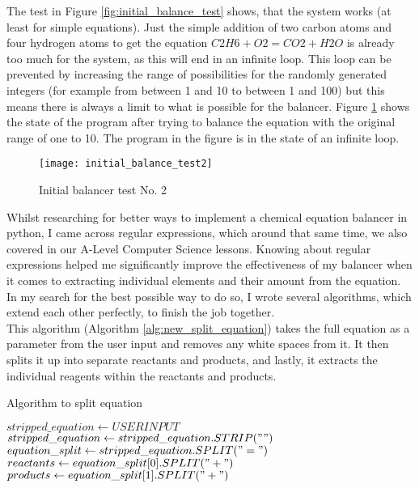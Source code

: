 \documentclass[a4paper,12pt]{article}
\begin{document}
The test in Figure \ref{fig:initial_balance_test} shows, that the system works (at least for simple equations). Just the simple addition of two carbon atoms and four hydrogen atoms to get the equation $ C2H6 + O2 = CO2 + H2O$ is already too much for the system, as this will end in an infinite loop. This loop can be prevented by increasing the range of possibilities for the randomly generated integers (for example from between 1 and 10 to between 1 and 100) but this means there is always a limit to what is possible for the balancer. Figure \ref{fig:second_balance_test} shows the state of the program after trying to balance the equation with the original range of one to 10. The program in the figure is in the state of an infinite loop.

\begin{figure} [h]
	\centering
	\texttt{[image: initial\_balance\_test2]}
	\caption{Initial balancer test No. 2}
	\label{fig:second_balance_test}
\end{figure}

\newpage

Whilst researching for better ways to implement a chemical equation balancer in python, I came across regular expressions, which around that same time, we also covered in our A-Level Computer Science lessons. Knowing about regular expressions helped me significantly improve the effectiveness of my balancer when it comes to extracting individual elements and their amount from the equation. In my search for the best possible way to do so, I wrote several algorithms, which extend each other perfectly, to finish the job together.\\
This algorithm (Algorithm \ref{alg:new_split_equation}) takes the full equation as a parameter from the user input and removes any white spaces from it. It then splits it up into separate reactants and products, and lastly, it extracts the individual reagents within the reactants and products.
\begin{algorithm}
\caption{Algorithm to split equation}\label{alg:new_split_equation}
\begin{algorithmic}
\State $ stripped\_equation \gets USERINPUT$
\State $ stripped\_equation \gets stripped\_equation.STRIP(" ")$
\State $ equation\_split \gets stripped\_equation.SPLIT("=")$
\State $ reactants \gets equation\_split[0].SPLIT("+")$
\State $ products \gets equation\_split[1].SPLIT("+")$
\EndFunction
\end{algorithmic}
\end{algorithm}
\end{document}
